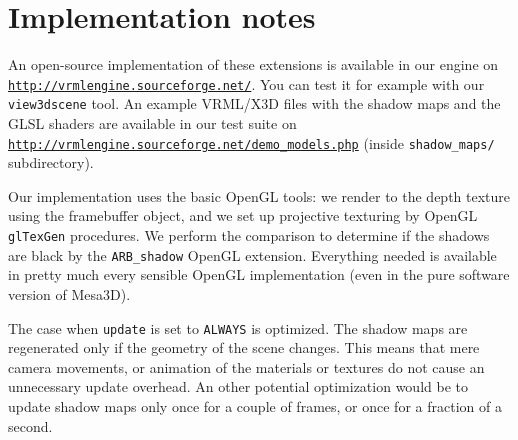 \documentclass{acmsiggraph}                     %
\newenvironment{mycode}
{\begin{mycodecore}}
{\end{mycodecore}
\vspace{-0.1in}}
\newcommand*{\myhref}[2]{\texttt{\href{#1}{\nolinkurl{#2}}}}
\begin{document}



\section{Implementation notes}

An open-source implementation of these extensions is available in our engine on
\myhref{http://vrmlengine.sourceforge.net/}{http://vrmlengine.sourceforge.net/}.
You can test it for example with our \texttt{view3dscene} tool.
An example VRML/X3D files with the shadow maps and the GLSL shaders are available in our test suite
on \myhref{http://vrmlengine.sourceforge.net/demo\_models.php}{http://vrmlengine.sourceforge.net/demo_models.php}
(inside \texttt{shadow\_maps/} subdirectory).

Our implementation uses the basic OpenGL tools: we render to the depth
texture using the framebuffer object, and we set up projective texturing
by OpenGL \texttt{glTexGen} procedures.
We perform the comparison to determine if the shadows are black by the
\texttt{ARB\_shadow} OpenGL extension.
Everything needed is available in pretty much every sensible OpenGL
implementation (even in the pure software version of Mesa3D).

The case when \texttt{update} is set to \texttt{ALWAYS} is optimized.
The shadow maps are regenerated
only if the geometry of the scene changes. This means that mere camera
movements, or animation of the materials or textures do not cause
an unnecessary update overhead.
An other potential optimization would be to
update shadow maps only once for a couple of frames, or once for
a fraction of a second.
\end{document}
